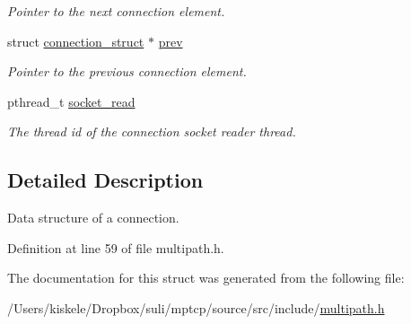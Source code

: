 \begin{DoxyCompactItemize}
\begin{DoxyCompactList}\small\item\em Pointer to the next connection element. \end{DoxyCompactList}\item 
\hypertarget{structconnection__struct_ab1a0964aa3c812ad10454eb38d92df2d}{struct \hyperlink{structconnection__struct}{connection\-\_\-struct} $\ast$ \hyperlink{structconnection__struct_ab1a0964aa3c812ad10454eb38d92df2d}{prev}}\label{structconnection__struct_ab1a0964aa3c812ad10454eb38d92df2d}

\begin{DoxyCompactList}\small\item\em Pointer to the previous connection element. \end{DoxyCompactList}\item 
\hypertarget{structconnection__struct_a3bd5214a3b222e99dca12c5d241e6955}{pthread\-\_\-t \hyperlink{structconnection__struct_a3bd5214a3b222e99dca12c5d241e6955}{socket\-\_\-read}}\label{structconnection__struct_a3bd5214a3b222e99dca12c5d241e6955}

\begin{DoxyCompactList}\small\item\em The thread id of the connection socket reader thread. \end{DoxyCompactList}\end{DoxyCompactItemize}


\subsection{Detailed Description}
Data structure of a connection. 

Definition at line 59 of file multipath.\-h.



The documentation for this struct was generated from the following file\-:\begin{DoxyCompactItemize}
\item 
/\-Users/kiskele/\-Dropbox/suli/mptcp/source/src/include/\hyperlink{multipath_8h}{multipath.\-h}\end{DoxyCompactItemize}
